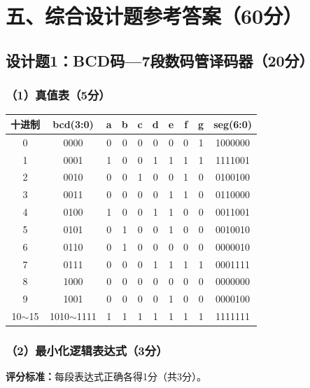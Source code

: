 \newpage

\section{五、综合设计题参考答案（60分）}

\subsection{设计题1：BCD码—7段数码管译码器（20分）}

\subsubsection{（1）真值表（5分）}

\begin{center}
\begin{tabular}{|c|c|c|c|c|c|c|c|c|c|}
\hline
\textbf{十进制} & \textbf{bcd(3:0)} & \textbf{a} & \textbf{b} & \textbf{c} & \textbf{d} & \textbf{e} & \textbf{f} & \textbf{g} & \textbf{seg(6:0)} \\
\hline
0 & 0000 & 0 & 0 & 0 & 0 & 0 & 0 & 1 & 1000000 \\
1 & 0001 & 1 & 0 & 0 & 1 & 1 & 1 & 1 & 1111001 \\
2 & 0010 & 0 & 0 & 1 & 0 & 0 & 1 & 0 & 0100100 \\
3 & 0011 & 0 & 0 & 0 & 0 & 1 & 1 & 0 & 0110000 \\
4 & 0100 & 1 & 0 & 0 & 1 & 1 & 0 & 0 & 0011001 \\
5 & 0101 & 0 & 1 & 0 & 0 & 1 & 0 & 0 & 0010010 \\
6 & 0110 & 0 & 1 & 0 & 0 & 0 & 0 & 0 & 0000010 \\
7 & 0111 & 0 & 0 & 0 & 1 & 1 & 1 & 1 & 0001111 \\
8 & 1000 & 0 & 0 & 0 & 0 & 0 & 0 & 0 & 0000000 \\
9 & 1001 & 0 & 0 & 0 & 0 & 1 & 0 & 0 & 0000100 \\
10$\sim$15 & 1010$\sim$1111 & 1 & 1 & 1 & 1 & 1 & 1 & 1 & 1111111 \\
\hline
\end{tabular}
\end{center}

\subsubsection{（2）最小化逻辑表达式（3分）}

\begin{framed}
\textbf{评分标准：}每段表达式正确各得1分（共3分）。
\end{framed}

